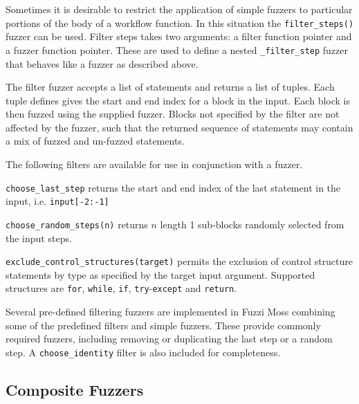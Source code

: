 \documentclass{sig-alternate}
\newenvironment{FunctionList}{%
\lstset{basicstyle=\ttfamily\bfseries\small}
\begin{list}{}{\leftmargin=5pt}
}{\end{list}\lstset{basicstyle=\ttfamily\small}}
\begin{document}

Sometimes it is desirable to restrict the application of simple fuzzers to
particular portions of the body of a workflow function.  In this situation the
\lstinline!filter_steps()! fuzzer can be used.  Filter steps takes two
arguments: a filter function pointer and a fuzzer function pointer.  These are
used to define a nested \lstinline!_filter_step! fuzzer that behaves like a
fuzzer as described above.

The filter fuzzer accepts a list of statements and returns a list of tuples.
Each tuple defines gives the start and end index for a block in the input.  Each
block is then fuzzed using the supplied fuzzer.  Blocks not specified by the
filter are not affected by the fuzzer, such that the returned sequence of
statements may contain a mix of fuzzed and un-fuzzed statements.

The following filters are available for use in conjunction with a fuzzer.

\begin{FunctionList}

\item \lstinline!choose_last_step! returns the start and end index of the last
  statement in the input, i.e. \lstinline!input[-2:-1]!

\item \lstinline!choose_random_steps(n)!  returns $n$ length 1 sub-blocks
  randomly selected from the input steps.

\item \lstinline!exclude_control_structures(target)! permits the exclusion of
  control structure statements by type as specified by the target input
  argument. Supported structures are \lstinline!for!, \lstinline!while!,
  \lstinline!if!, \lstinline!try!-\lstinline!except! and \lstinline!return!.

\end{FunctionList}

Several pre-defined filtering fuzzers are implemented in Fuzzi Moss combining
some of the predefined filters and simple fuzzers.  These provide commonly
required fuzzers, including removing or duplicating the last step or a random
step. A \lstinline!choose_identity! filter is also included for completeness.


\subsection{Composite Fuzzers}
\end{document}
